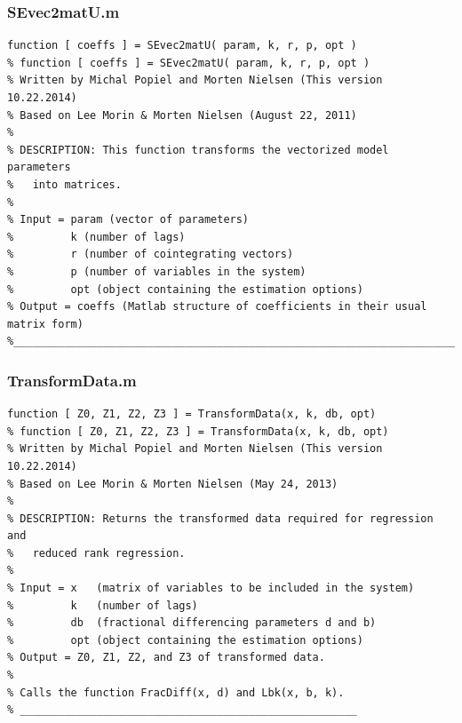 \documentclass[10pt]{article}
\begin{document}
\subsubsection{SEvec2matU.m}
\begin{lstlisting}[frame=single,caption={SEvec2matU.m}]
function [ coeffs ] = SEvec2matU( param, k, r, p, opt )
% function [ coeffs ] = SEvec2matU( param, k, r, p, opt )
% Written by Michal Popiel and Morten Nielsen (This version 10.22.2014)
% Based on Lee Morin & Morten Nielsen (August 22, 2011)
% 
% DESCRIPTION: This function transforms the vectorized model parameters
% 	into matrices.
%
% Input = param (vector of parameters)
%         k (number of lags)
%         r (number of cointegrating vectors)
%         p (number of variables in the system)
%         opt (object containing the estimation options)
% Output = coeffs (Matlab structure of coefficients in their usual matrix form)
%_________________________________________________________________________
\end{lstlisting}

\subsubsection{TransformData.m}
\begin{lstlisting}[frame=single,caption={TransformData.m}]
function [ Z0, Z1, Z2, Z3 ] = TransformData(x, k, db, opt)
% function [ Z0, Z1, Z2, Z3 ] = TransformData(x, k, db, opt)
% Written by Michal Popiel and Morten Nielsen (This version 10.22.2014)
% Based on Lee Morin & Morten Nielsen (May 24, 2013)
%
% DESCRIPTION: Returns the transformed data required for regression and
% 	reduced rank regression.
% 
% Input = x   (matrix of variables to be included in the system)
%         k   (number of lags)
%         db  (fractional differencing parameters d and b)
%         opt (object containing the estimation options)
% Output = Z0, Z1, Z2, and Z3 of transformed data.
%
% Calls the function FracDiff(x, d) and Lbk(x, b, k).
% _____________________________________________________
\end{lstlisting}
\end{document}
